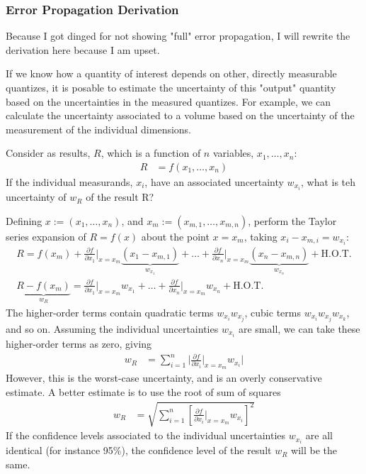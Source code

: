 \subsubsection{Error Propagation Derivation}
\label{sec:error_propagation_derivation}
Because I got dinged for not showing "full" error propagation, I will rewrite the derivation here because I am upset. 

If we know how a quantity of interest depends on other, directly measurable quantizes, it is posable to estimate the uncertainty of this "output" quantity based on the uncertainties in the measured quantizes. For example, we can calculate the uncertainty associated to a volume based on the uncertainty of the measurement of the individual dimensions.

Consider as results, $R$, which is a function of $n$ variables, $x_1, \ldots, x_n$:
\begin{align*}
    R &= f(x_1, \ldots, x_n)
\end{align*}
If the individual measurands, $x_i$, have an associated uncertainty $w_{x_i}$, what is teh uncertainty of $w_R$ of the result R?

Defining $x:= (x_1, \ldots, x_n)$, and $x_m := (x_{m, 1}, \ldots, x_{m, n})$, perform the Taylor series expansion of $R= f(x)$ about the point $x = x_m$, taking $x_i - x_{m, i} = w_{x_i}$:
\begin{gather*}
    R = f(x_m) + \frac{\partial f}{\partial x_1} \bigg|_{x = x_m} \underbrace{(x_1 - x_{m, 1})}_{w_{x_1}} + \ldots + \frac{\partial f}{\partial x_n} \bigg|_{x = x_m} \underbrace{(x_n - x_{m, n})}_{w_{x_n}} + \text{H.O.T.} \\
    \underbrace{R - f(x_m)}_{w_R} = \frac{\partial f}{\partial x_1} \bigg|_{x = x_m} w_{x_1} + \ldots + \frac{\partial f}{\partial x_n} \bigg|_{x = x_m} w_{x_n} + \text{H.O.T.}
\end{gather*}
The higher-order terms contain quadratic terms $w_{x_i}w_{x_j}$, cubic terms $w_{x_i}w_{x_j}w_{x_k}$, and so on. Assuming the individual uncertainties $w_{x_i}$ are small,  we can take these higher-order terms as zero, giving 
\begin{align*}
    w_R &= \sum_{i=1}^n \bigg|\frac{\partial f}{\partial x_i} \bigg|_{x = x_m} w_{x_i} \bigg|
\end{align*}
However, this is the worst-case uncertainty, and is an overly conservative estimate. A better estimate is to use the root of sum of squares
\begin{align}
    w_R &= \sqrt{\sum_{i=1}^n \left[\frac{\partial f}{\partial x_i} \bigg|_{x = x_m} w_{x_i}\right]^2} \label{eq:error_propagation}
\end{align}
If the confidence levels associated to the individual uncertainties $w_{x_i}$ are all identical (for instance 95\%), the confidence level of the result $w_R$ will be the same. 

